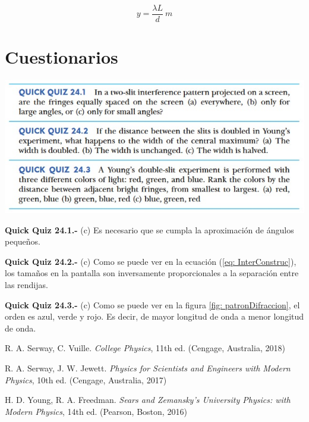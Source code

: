 \documentclass[a4paper,12pt]{article}
\newenvironment{Figure}
  {\par\medskip\noindent\minipage{\linewidth}}
  {\endminipage\par\medskip}
\begin{document}
    \begin{equation}
        y =  \frac{\lambda L}{d}\ m
        \label{eq: InterConstruc}
    \end{equation}

\section*{Cuestionarios}

    \begin{Figure}
        \centering
        \includegraphics[width=0.8\linewidth]{quiz.jpg}
        \label{fig: cuestionarios}
    \end{Figure}

    \textbf{Quick Quiz 24.1.-} (c) Es necesario que se cumpla la aproximación de ángulos pequeños.

    \textbf{Quick Quiz 24.2.-} (c) Como se puede ver en la ecuación (\ref{eq: InterConstruc}), los tamaños en la pantalla son inversamente proporcionales a la separación entre las rendijas.
    
    \textbf{Quick Quiz 24.3.-} (c) Como se puede ver en la figura \ref{fig: patronDifraccion}, el orden es azul, verde y rojo. Es decir, de mayor longitud de onda a menor longitud de onda.

\begin{thebibliography}{99}

\bibitem{} R. A. Serway, C. Vuille. \emph{College Physics}, 11th ed. (Cengage, Australia, 2018)

\bibitem{} R. A. Serway, J. W. Jewett. \emph{Physics for Scientists and Engineers with Modern Physics}, 10th ed. (Cengage, Australia, 2017)

\bibitem{} H. D. Young, R. A. Freedman. \emph{Sears and Zemansky's University Physics: with Modern Physics}, 14th ed. (Pearson, Boston, 2016)

\end{thebibliography}
\end{document}
